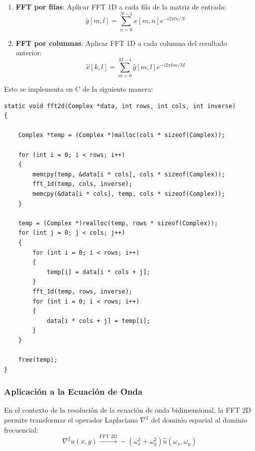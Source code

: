 \documentclass[a4paper]{article}
\begin{document}
\begin{enumerate}
    \item \textbf{FFT por filas}: Aplicar FFT 1D a cada fila de la matriz de entrada:
          \begin{equation}
              \hat{y}[m,l] = \sum_{n=0}^{N-1} x[m,n] e^{-i2\pi ln/N}
          \end{equation}

    \item \textbf{FFT por columnas}: Aplicar FFT 1D a cada columna del resultado anterior:
          \begin{equation}
              \hat{x}[k,l] = \sum_{m=0}^{M-1} \hat{y}[m,l] e^{-i2\pi km/M}
          \end{equation}
\end{enumerate}

Esto se implementa en C de la siguiente manera:
\begin{verbatim}
static void fft2d(Complex *data, int rows, int cols, int inverse)
{

    Complex *temp = (Complex *)malloc(cols * sizeof(Complex));

    for (int i = 0; i < rows; i++)
    {
        memcpy(temp, &data[i * cols], cols * sizeof(Complex));
        fft_1d(temp, cols, inverse);
        memcpy(&data[i * cols], temp, cols * sizeof(Complex));
    }

    temp = (Complex *)realloc(temp, rows * sizeof(Complex));
    for (int j = 0; j < cols; j++)
    {
        for (int i = 0; i < rows; i++)
        {
            temp[i] = data[i * cols + j];
        }
        fft_1d(temp, rows, inverse);
        for (int i = 0; i < rows; i++)
        {
            data[i * cols + j] = temp[i];
        }
    }

    free(temp);
}
\end{verbatim}

\subsubsection{Aplicación a la Ecuación de Onda}

En el contexto de la resolución de la ecuación de onda bidimensional, la FFT 2D permite transformar el operador Laplaciano $\nabla^2$ del dominio espacial al dominio frecuencial:
\begin{equation}
    \nabla^2 u(x,y) \xrightarrow{\text{FFT 2D}} -(\omega_x^2 + \omega_y^2) \hat{u}(\omega_x, \omega_y)
\end{equation}
\end{document}
